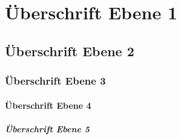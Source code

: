 \documentclass{article}
\begin{document}
  \tableofcontents

  \section{Überschrift Ebene 1}
  \subsection{Überschrift Ebene 2}
  \subsubsection{Überschrift Ebene 3}
  \paragraph{Überschrift Ebene 4}
  \subparagraph{Überschrift Ebene 5}
\end{document}
